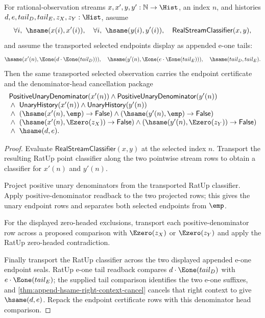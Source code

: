 \begin{theorem}
\label{thm:real-stream-classifier-transported-selected-certified-e1-tail-cancellation-envelope}
For rational-observation streams $x,x',y,y':\mathbb{N}\to\Hist$, an index
$n$, and histories $d,e,tail_D,tail_E,z_X,z_Y:\Hist$, assume
$$
\forall i,\ \hsame(x(i),x'(i)),\quad
\forall i,\ \hsame(y(i),y'(i)),\quad
\mathsf{RealStreamClassifier}(x,y),
$$
and assume the transported selected endpoints display as appended e-one tails:
$$
\hsame(x'(n),\Eone(d\cdot\Eone(tail_D))),\quad
\hsame(y'(n),\Eone(e\cdot\Eone(tail_E))),\quad
\hsame(tail_D,tail_E).
$$
Then the same transported selected observation carries the endpoint certificate
and the denominator-head cancellation package
$$
\begin{array}{l}
\mathsf{PositiveUnaryDenominator}(x'(n))\land
\mathsf{PositiveUnaryDenominator}(y'(n))\\
{}\land\ \mathsf{UnaryHistory}(x'(n))\land
\mathsf{UnaryHistory}(y'(n))\\
{}\land\ (\hsame(x'(n),\emp)\to\mathsf{False})\land
(\hsame(y'(n),\emp)\to\mathsf{False})\\
{}\land\ (\hsame(x'(n),\Ezero(z_X))\to\mathsf{False})\land
(\hsame(y'(n),\Ezero(z_Y))\to\mathsf{False})\\
{}\land\ \hsame(d,e).
\end{array}
$$
\end{theorem}
\begin{proof}
Evaluate $\mathsf{RealStreamClassifier}(x,y)$ at the selected index $n$.
Transport the resulting RatUp point classifier along the two pointwise stream
rows to obtain a classifier for $x'(n)$ and $y'(n)$.

Project positive unary denominators from the transported RatUp classifier.
Apply positive-denominator readback to the two projected rows; this gives the
unary endpoint rows and separates both selected endpoints from $\emp$.

For the displayed zero-headed exclusions, transport each positive-denominator
row across a proposed comparison with $\Ezero(z_X)$ or $\Ezero(z_Y)$ and apply
the RatUp zero-headed contradiction.

Finally transport the RatUp classifier across the two displayed appended e-one
endpoint seals. RatUp e-one tail readback compares
$d\cdot\Eone(tail_D)$ with $e\cdot\Eone(tail_E)$; the supplied tail comparison
identifies the two e-one suffixes, and
\autoref{thm:append-hsame-right-context-cancel} cancels that right context to
give $\hsame(d,e)$. Repack the endpoint certificate rows with this denominator
head comparison.
\end{proof}

